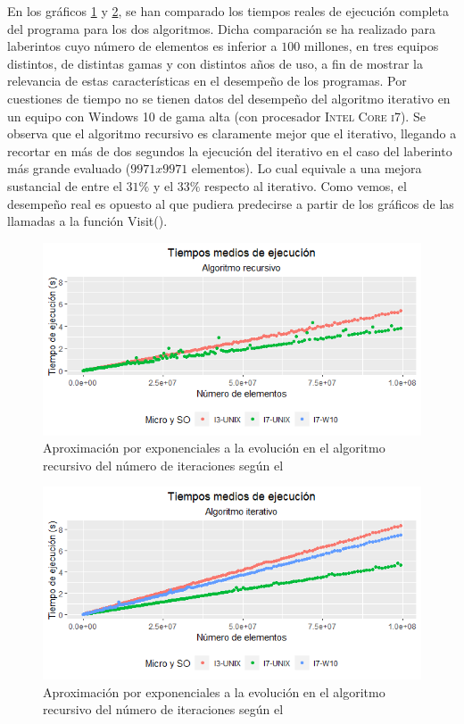 \documentclass[12pt,a4paper]{article}
\begin{document}
En los gráficos \ref{grafico4} y \ref{grafico5}, se han comparado los tiempos reales de ejecución completa del programa para los dos algoritmos. Dicha comparación se ha realizado para laberintos cuyo número de elementos es inferior a $100$ millones, en tres equipos distintos, de distintas gamas y con distintos años de uso, a fin de mostrar la relevancia de estas características en el desempeño de los programas. Por cuestiones de tiempo no se tienen datos del desempeño del algoritmo iterativo en un equipo con Windows 10 de gama alta (con procesador \textsc{Intel Core i7}). Se observa que el algoritmo recursivo es claramente mejor que el iterativo, llegando a recortar en más de dos segundos la ejecución del iterativo en el caso del laberinto más grande evaluado ($9971 x 9971$ elementos). Lo cual equivale a una mejora sustancial de entre el $31\%$ y el $33\%$ respecto al iterativo. Como vemos, el desempeño real es opuesto al que pudiera predecirse a partir de los gráficos de las llamadas a la función Visit(). 

\begin{figure}[h]
	\centering
	\includegraphics[scale=0.9]{fotos/Tiempos_recursivo.png}
	\caption{Aproximación por exponenciales a la evolución en el algoritmo recursivo del número de iteraciones según el }
	\label{grafico4}
\end{figure}
\vspace{0.2cm}

\begin{figure}[h]
	\centering
	\includegraphics[scale=0.9]{fotos/Tiempos_Iterativo.png}
	\caption{Aproximación por exponenciales a la evolución en el algoritmo recursivo del número de iteraciones según el }
	\label{grafico5}
\end{figure}
\vspace{0.2cm}
\end{document}
